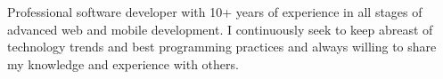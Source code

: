 


\begin{cvparagraph}

Professional software developer with 10+ years of experience in all stages of advanced web and mobile development.
I continuously seek to keep abreast of technology trends and best programming practices and always willing to share my knowledge and experience with others.
\end{cvparagraph}
\vspace{-2mm}

